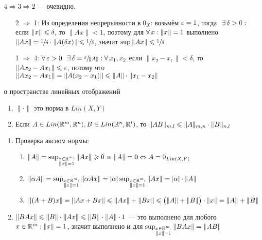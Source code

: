 \begin{prf}
	$4 \Rightarrow 3 \Rightarrow 2$ --- очевидно.
	\begin{itemize}[leftmargin=55pt]
		\item[2 $\Rightarrow$ 1:]  
		Из определения непрерывности в $0_X$: возьмём $\varepsilon = 1$, тогда$\E \delta > 0 :{}$если $\|x\| \leqslant \delta$, то $\|Ax\| < 1$, поэтому для $\forall \, x : \|x\| = 1$ выполнено $\|Ax\| = \sfrac{1}{\delta} \cdot \|A (\delta x)\| \leqslant \sfrac{1}{\delta}$, значит $\sup\|Ax\| \leqslant \sfrac{1}{\delta}$\medskip
		
		\item[1 $\Rightarrow$ 4:] $\A \eps > 0 \E \delta = \sfrac{\eps}{\|A\|} : \A x_1, x_2$ если $\|x_2 - x_1\| < \delta$, то $\|Ax_2 - Ax_1\| \leqslant \varepsilon$, потому что $\|Ax_2 - Ax_1\| = \|A(x_2 - x_1)\| \leqslant \|A\| \cdot \|x_1 - x_2\|$
	\end{itemize}
\end{prf}
\vspace{-15pt}
\begin{teor}[https://youtu.be/OazzLm0DJN4?si=rQwhPft7RLfNzztG&t=2414]{о пространстве линейных отображений}
	\vspace{-15pt}
	\begin{enumerate}
		\item $\|\cdot\|$ это норма в $Lin(X, Y)$
		
		\item Если $A \in Lin(\mathbb R^m, \mathbb R^n), B \in Lin(\mathbb R^n, \mathbb R^l)$, то $\|AB\|_{m,l} \leqslant \|A\|_{m, n} \cdot \|B\|_{n,l}$
	\end{enumerate}
\end{teor}

\begin{prf}
	\begin{enumerate}
		\item Проверка аксиом нормы:
		\begin{enumerate}
		\item $\|A\| = \sup_{\substack{x \in \mathbb R^m : \\ \|x\| = 1}} \|Ax\| \geqslant 0$ и $\|A\| = 0 \Leftrightarrow A = 0_{Lin(X, Y)}$
		
		\item $\|\alpha A\| = \sup_{\substack{x \in \mathbb R^m: \\ \|x\| = 1}} \|\alpha Ax\| = |\alpha| \sup_{\substack{x \in \mathbb R^m: \\ \|x\| = 1}} \|Ax\| = |\alpha| \cdot \|A\|$
		
		\item $\|(A + B)x\| = \|Ax + Bx\| \leqslant \|Ax\| + \|Bx\| \leqslant \bigl(\|A\| + \|B\|\bigr) \cdot \|x\| = \|A\| + \|B\|$
		\end{enumerate}
		
	\item $\|BAx\| \leqslant \|B\|\cdot \|Ax\| \leqslant \|B\| \cdot \|A\|\cdot 1$ --- это выполнено для любого $x \in \mathbb R^m : \|x\| = 1$, значит выполнено и для $\sup_{\substack{x \in \mathbb R^m: \\ \|x\| = 1}}\|BAx\| = \|AB\|$  
	\end{enumerate}
\end{prf}

